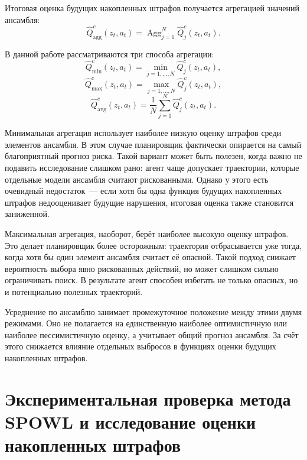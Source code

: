 Итоговая оценка будущих накопленных штрафов получается агрегацией значений ансамбля:
\begin{equation}
    \hat{Q}^c_{\mathrm{agg}}(z_t,a_t)
    =
    \operatorname{Agg}_{j=1}^{N}\hat{Q}^c_j(z_t,a_t).
\end{equation}

В данной работе рассматриваются три способа агрегации:
\begin{equation}
    \hat{Q}^c_{\min}(z_t,a_t)
    =
    \min_{j=1,\ldots,N}\hat{Q}^c_j(z_t,a_t),
\end{equation}
\begin{equation}
    \hat{Q}^c_{\max}(z_t,a_t)
    =
    \max_{j=1,\ldots,N}\hat{Q}^c_j(z_t,a_t),
\end{equation}
\begin{equation}
    \hat{Q}^c_{\mathrm{avg}}(z_t,a_t)
    =
    \frac{1}{N}\sum_{j=1}^{N}\hat{Q}^c_j(z_t,a_t).
\end{equation}

Минимальная агрегация использует наиболее низкую оценку штрафов среди элементов ансамбля. В этом случае планировщик фактически опирается на самый благоприятный прогноз риска. Такой вариант может быть полезен, когда важно не подавить исследование слишком рано: агент чаще допускает траектории, которые отдельные модели ансамбля считают рискованными. Однако у этого есть очевидный недостаток~--- если хотя бы одна функция будущих накопленных штрафов недооценивает будущие нарушения, итоговая оценка также становится заниженной.

Максимальная агрегация, наоборот, берёт наиболее высокую оценку штрафов. Это делает планировщик более осторожным: траектория отбрасывается уже тогда, когда хотя бы один элемент ансамбля считает её опасной. Такой подход снижает вероятность выбора явно рискованных действий, но может слишком сильно ограничивать поиск. В результате агент способен избегать не только опасных, но и потенциально полезных траекторий.

Усреднение по ансамблю занимает промежуточное положение между этими двумя режимами. Оно не полагается на единственную наиболее оптимистичную или наиболее пессимистичную оценку, а учитывает общий прогноз ансамбля. За счёт этого снижается влияние отдельных выбросов в функциях оценки будущих накопленных штрафов.

\section{Экспериментальная проверка метода SPOWL и исследование оценки накопленных штрафов}
\label{sec:spowl_experiments}

